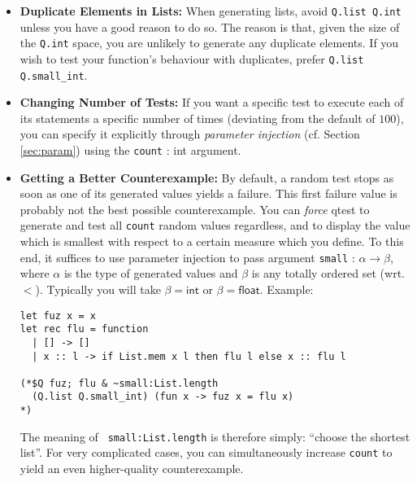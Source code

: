\begin{itemize}
\item \textbf{Duplicate Elements in Lists:}
When generating lists, avoid \texttt{Q.list Q.int} unless you have a good reason to do so.
The reason is that, given the size of the \texttt{Q.int} space, you are unlikely
to generate any duplicate elements. If you wish to test your function's behaviour with
duplicates, prefer \texttt{Q.list Q.small\_int}.

\item \textbf{Changing Number of Tests:}
If you want a specific test to execute each of its statements a specific number of times
(deviating from the default of $100$), you can specify it explicitly through
\emph{parameter injection} (cf. Section \ref{sec:param}) using the
\texttt{count} : \textsf{int} argument.

\item \textbf{Getting a Better Counterexample:}
By default, a random test stops as soon as one of its generated values
yields a failure. This first failure value is probably not the best possible
counterexample. You can \emph{force} qtest to generate and test all \texttt{count}
random values regardless, and to display the value which is smallest with respect
to a certain measure which you define. To this end, it suffices to use parameter injection
to pass argument \texttt{small} : $\alpha \to \beta$,
where $\alpha$ is the type of
generated values and $\beta$ is any totally ordered set (wrt. $<$). Typically
you will take $\beta = \textsf{int}$ or $\beta = \textsf{float}$. Example:
\begin{verbatim}
let fuz x = x
let rec flu = function
  | [] -> []
  | x :: l -> if List.mem x l then flu l else x :: flu l

(*$Q fuz; flu & ~small:List.length
  (Q.list Q.small_int) (fun x -> fuz x = flu x)
*)
\end{verbatim}
The meaning of \texttt{~small:List.length} is therefore simply:
``choose the shortest list''. For very complicated cases, you can simultaneously
increase \texttt{count} to yield an even higher-quality counterexample.

\end{itemize}


